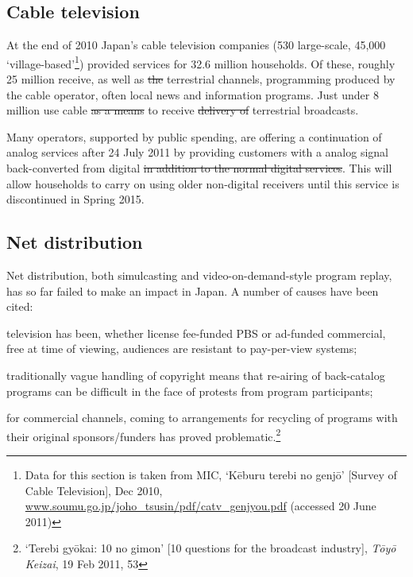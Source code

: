 \documentclass[11pt, oneside, a4paper, headsepline]{scrartcl}
\newenvironment{close_item}{
\begin{itemize}
 \setlength{\itemsep}{1pt}
 \setlength{\parskip}{1pt}
 \setlength{\parsep}{0pt}}{\end{itemize}
}
\newcommand{\TYKZ}{\emph{T\={o}y\={o} Keizai}}
\begin{document}
\subsection{Cable television}

At the end of 2010 Japan's cable television companies (530 large-scale, 45,000 `village-based'\footnote{Data for this section is taken from MIC, `K\={e}buru terebi no genj\={o}' [Survey of Cable Television], Dec 2010, \url{www.soumu.go.jp/joho_tsusin/pdf/catv_genjyou.pdf} (accessed 20 June 2011)}) provided services for 32.6 million households. Of these, roughly 25 million receive, as well as \st{the} terrestrial channels, programming produced by the cable operator, often local news and information programs. Just under 8 million use cable \st{as a means} to receive \st{delivery of} terrestrial broadcasts. 


Many operators, supported by public spending, are offering a continuation of analog services after 24 July 2011 by providing customers with a analog signal back-converted from digital\st{ in addition to the normal digital services}. This will allow households to carry on using older non-digital receivers until this service is discontinued in Spring 2015. 

\subsection{Net distribution}
\label{netdistrib}
Net distribution, both simulcasting and video-on-demand-style program replay, has so far failed to make an impact in Japan. A number of causes have been cited: 

\begin{close_item}
\item television has been, whether license fee-funded PBS or ad-funded commercial, free at time of viewing, audiences are resistant to pay-per-view systems;
\item traditionally vague handling of copyright means that re-airing of back-catalog programs can be difficult in the face of protests from program participants;
\item for commercial channels, coming to arrangements for recycling of programs with their original sponsors/funders has proved problematic.\footnote{`Terebi gy\={o}kai: 10 no gimon' [10 questions for the broadcast industry], \TYKZ, 19 Feb 2011, 53\label{note:gimon}} 
\end{close_item}
\end{document}
